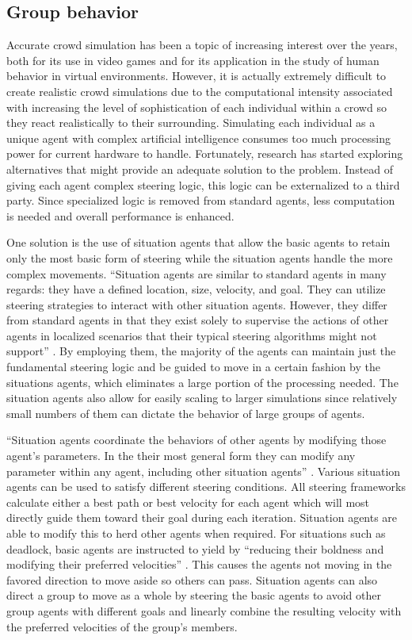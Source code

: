\documentclass[tog]{acmsiggraph}
\begin{document}
\subsection{Group behavior}

Accurate crowd simulation has been a topic of increasing interest over the years, both for its use in video games and for its application in the study of human behavior in virtual environments. However, it is actually extremely difficult to create realistic crowd simulations due to the computational intensity associated with increasing the level of sophistication of each individual within a crowd so they react realistically to their surrounding. Simulating each individual as a unique agent with complex artificial intelligence consumes too much processing power for current hardware to handle. Fortunately, research has started exploring alternatives that might provide an adequate solution to the problem. Instead of giving each agent complex steering logic, this logic can be externalized to a third party. Since specialized logic is removed from standard agents, less computation is needed and overall performance is enhanced.

One solution is the use of situation agents that allow the basic agents to retain only the most basic form of steering while the situation agents handle the more complex movements. ``Situation agents are similar to standard agents in many regards: they have a defined location, size, velocity, and goal. They can utilize steering strategies to interact with other situation agents. However, they differ from standard agents in that they exist solely to supervise the actions of other agents in localized scenarios that their typical steering algorithms might not support'' \cite{schuerman2010situation}. By employing them, the majority of the agents can maintain just the fundamental steering logic and be guided to move in a certain fashion by the situations agents, which eliminates a large portion of the processing needed. The situation agents also allow for easily scaling to larger simulations since relatively small numbers of them can dictate the behavior of large groups of agents. 

``Situation agents coordinate the behaviors of other agents by modifying those agent’s parameters. In the their most general form they can modify any parameter within any agent, including other situation agents'' \cite{schuerman2010situation}.  Various situation agents can be used to satisfy different steering conditions. All steering frameworks calculate either a best path or best velocity for each agent which will most directly guide them toward their goal during each iteration. Situation agents are able to modify this to herd other agents when required. For situations such as deadlock, basic agents are instructed to yield by ``reducing their boldness and modifying their preferred velocities'' \cite{schuerman2010situation}.  This causes the agents not moving in the favored direction to move aside so others can pass. Situation agents can also direct a group to move as a whole by steering the basic agents to avoid other group agents with different goals and linearly combine the resulting velocity with the preferred velocities of the group’s members. 
\end{document}
